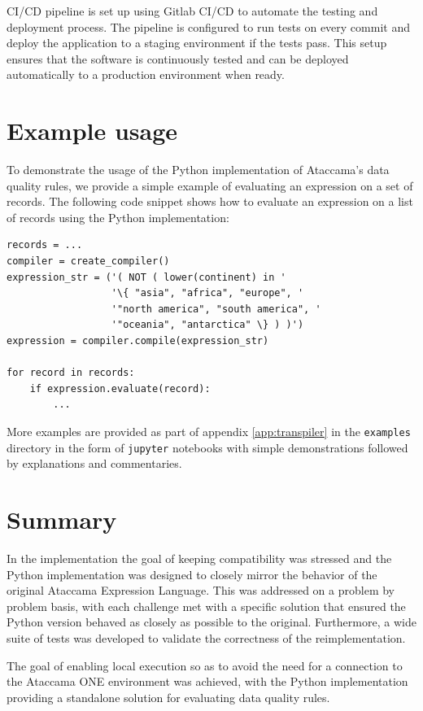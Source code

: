 CI/CD pipeline is set up using Gitlab CI/CD to automate the testing and deployment process. The pipeline is configured to run tests on every commit and deploy the application to a staging environment if the tests pass. This setup ensures that the software is continuously tested and can be deployed automatically to a production environment when ready.


\section{Example usage}

To demonstrate the usage of the Python implementation of Ataccama's data quality rules, we provide a simple example of evaluating an expression on a set of records. The following code snippet shows how to evaluate an expression on a list of records using the Python implementation:

\begin{verbatim}
records = ...
compiler = create_compiler()
expression_str = ('( NOT ( lower(continent) in '
                  '\{ "asia", "africa", "europe", '
                  '"north america", "south america", '
                  '"oceania", "antarctica" \} ) )')
expression = compiler.compile(expression_str)

for record in records:
    if expression.evaluate(record):
        ...
\end{verbatim}

More examples are provided as part of appendix \ref{app:transpiler} in the \texttt{examples} directory in the form of \texttt{jupyter} \cite{jupyter} notebooks with simple demonstrations followed by explanations and commentaries. 

\section{Summary}

In the implementation the goal of keeping compatibility was stressed and the Python implementation was designed to closely mirror the behavior of the original Ataccama Expression Language. This was addressed on a problem by problem basis, with each challenge met with a specific solution that ensured the Python version behaved as closely as possible to the original. Furthermore, a wide suite of tests was developed to validate the correctness of the reimplementation.

The goal of enabling local execution so as to avoid the need for a connection to the Ataccama ONE environment was achieved, with the Python implementation providing a standalone solution for evaluating data quality rules.